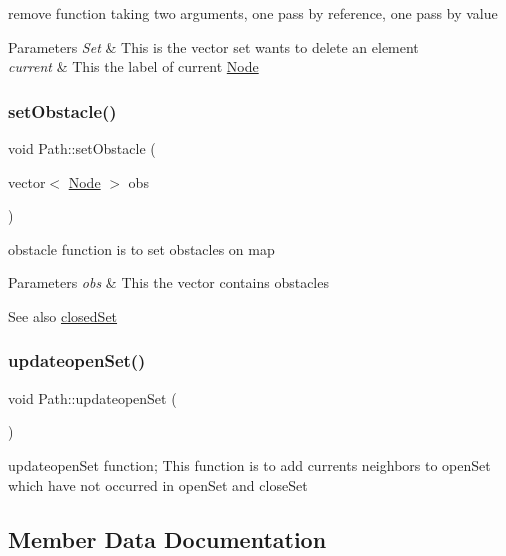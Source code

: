 remove function taking two arguments, one pass by reference, one pass by value 


\begin{DoxyParams}{Parameters}
{\em Set} & This is the vector set wants to delete an element \\
\hline
{\em current} & This the label of current \hyperlink{classNode}{Node} \\
\hline
\end{DoxyParams}
\mbox{\label{classPath_a0487872dab008b8ebd27f23d27a52ca7}} 
\subsubsection{\texorpdfstring{set\+Obstacle()}{setObstacle()}}
{\footnotesize\ttfamily void Path\+::set\+Obstacle (\begin{DoxyParamCaption}\item[{vector$<$ \hyperlink{classNode}{Node} $>$}]{obs }\end{DoxyParamCaption})}

obstacle function is to set obstacles on map 
\begin{DoxyParams}{Parameters}
{\em obs} & This the vector contains obstacles \\
\hline
\end{DoxyParams}
\begin{DoxySeeAlso}{See also}
\hyperlink{classPath_ad8a4a1de4c251768f60b28834466caaa}{closed\+Set} 
\end{DoxySeeAlso}
\mbox{\label{classPath_a9de6800363177b6346a05ca55ccc2d05}} 
\subsubsection{\texorpdfstring{updateopen\+Set()}{updateopenSet()}}
{\footnotesize\ttfamily void Path\+::updateopen\+Set (\begin{DoxyParamCaption}{ }\end{DoxyParamCaption})}

updateopen\+Set function; This function is to add current\textquotesingle{}s neighbors to open\+Set which have not occurred in open\+Set and close\+Set 

\subsection{Member Data Documentation}
\mbox{\label{classPath_ad8a4a1de4c251768f60b28834466caaa}} 
